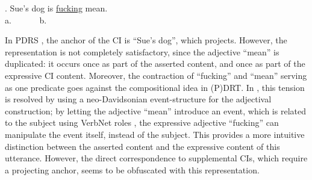\noindent\parbox[b]{\textwidth}{
\ex. Sue's dog is \underline{fucking} mean.\\
a.~~~
~~~b.~~~

}

\noindent In PDRS \Last[a], the anchor of the CI is ``Sue's dog'', which
projects.  However, the representation is not completely satisfactory, since
the adjective ``mean'' is duplicated: it occurs once as part of the asserted
content, and once as part of the expressive CI content. Moreover, the
contraction of ``fucking'' and ``mean'' serving as one predicate goes
against the compositional idea in (P)DRT. In \Last[b], this tension is
resolved by using a neo-Davidsonian event-structure for the adjectival
construction; by letting the adjective ``mean'' introduce an event, which is
related to the subject using VerbNet roles \citep{kipper2008large}, the
expressive adjective ``fucking'' can manipulate the event itself, instead of
the subject. This provides a more intuitive distinction between the asserted
content and the expressive content of this utterance. However, the direct
correspondence to supplemental CIs, which require a projecting anchor, seems
to be obfuscated with this representation.

